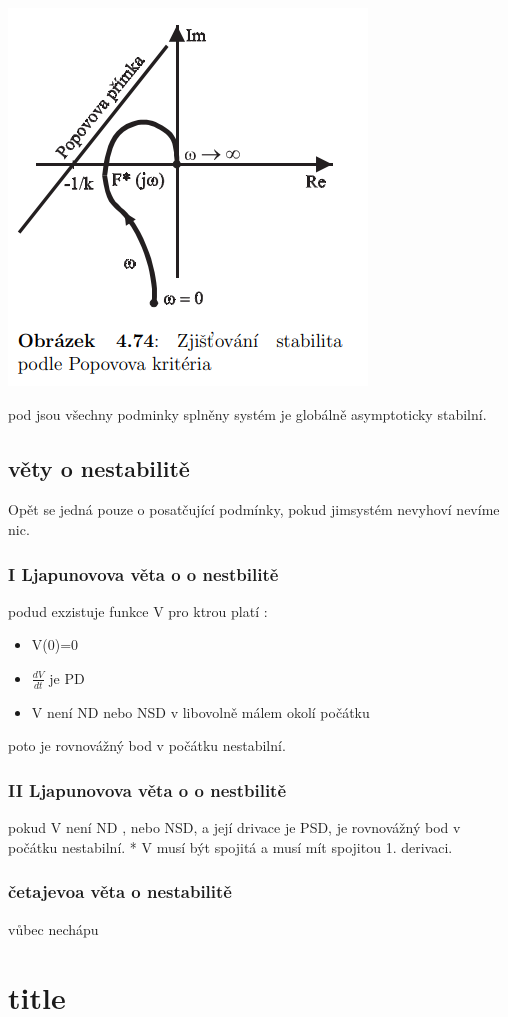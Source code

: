 \begin{itemize}
        \includegraphics{img/popov_frek.png}
\end{itemize}
pod jsou všechny podminky splněny systém je globálně asymptoticky stabilní.


\subsection{věty o nestabilitě}
Opět se jedná pouze o posatčující podmínky, pokud jimsystém nevyhoví nevíme nic.

\subsubsection{I Ljapunovova věta o o nestbilitě}
podud exzistuje funkce V pro ktrou platí :
\begin{itemize}
    \item V(0)=0
    \item $\frac{dV}{dt}$ je PD
    \item V není ND nebo NSD v libovolně málem okolí počátku
\end{itemize}
poto je rovnovážný bod v počátku nestabilní.


\subsubsection{II Ljapunovova věta o o nestbilitě}
pokud V není ND , nebo NSD, a její drivace je PSD, je rovnovážný bod v počátku nestabilní.
* V musí být spojitá a musí mít spojitou 1. derivaci.
\subsubsection{četajevoa věta o nestabilitě}
vůbec nechápu

\section{title}
